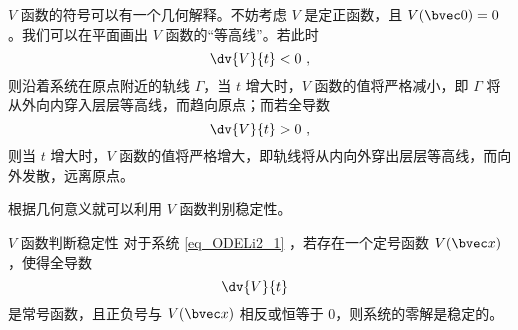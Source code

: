 $V$ 函数的符号可以有一个几何解释。不妨考虑 $V$ 是定正函数，且 $V(\bvec 0) = 0$。我们可以在平面画出 $V$ 函数的“等高线”。若此时 
\begin{equation}
\dv{V}{t} < 0 ~,
\end{equation}
则沿着系统在原点附近的轨线 $\Gamma$，当 $t$ 增大时，$V$ 函数的值将严格减小，即 $\Gamma$ 将从外向内穿入层层等高线，而趋向原点；而若全导数
\begin{equation}
\dv{V}{t} > 0 ~,
\end{equation}
则当 $t$ 增大时，$V$ 函数的值将严格增大，即轨线将从内向外穿出层层等高线，而向外发散，远离原点。

根据几何意义就可以利用 $V$ 函数判别稳定性。

\begin{theorem}{$V$ 函数判断稳定性}
对于系统 \autoref{eq_ODELi2_1} ，若存在一个定号函数 $V(\bvec x)$，使得全导数 
\begin{equation}
\dv{V}{t} ~~
\end{equation}
是常号函数，且正负号与 $V(\bvec x)$ 相反或恒等于 $0$，则系统的零解是稳定的。
\end{theorem}


